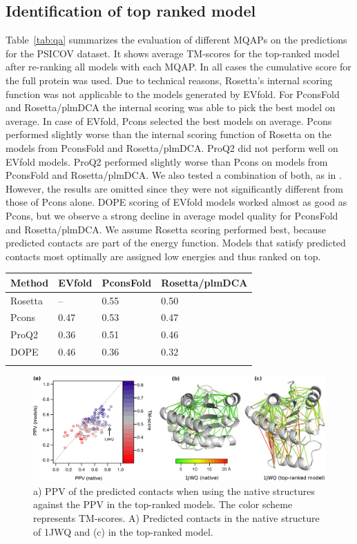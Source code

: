 \documentclass{bioinfo}
\begin{document}
\subsection{Identification of top ranked model}
Table~\ref{tab:qa} summarizes the evaluation of different MQAPs on the
predictions for the PSICOV dataset. It shows average TM-scores for the
top-ranked model after re-ranking all models with each MQAP. In all
cases the cumulative score for the full protein was used. Due to
technical reasons, Rosetta's internal scoring function was not
applicable to the models generated by EVfold. For PconsFold and
Rosetta/plmDCA the internal scoring was able to pick the best model on
average. In case of EVfold, Pcons selected the best models on
average. Pcons performed slightly worse than the internal scoring
function of Rosetta on the models from PconsFold and
Rosetta/plmDCA. ProQ2 did not perform well on EVfold models. ProQ2 performed slightly worse than
Pcons on models from PconsFold and Rosetta/plmDCA. We also tested a
combination of both, as in \citeauthor{wallner_pcons.net:_2007}
\citeyear{wallner_pcons.net:_2007}. However, the results are omitted
since they were not significantly different from those of Pcons
alone. DOPE scoring of EVfold models worked almost as good as Pcons,
but we observe a strong decline in average model quality for PconsFold
and Rosetta/plmDCA. We assume Rosetta scoring performed best, because predicted contacts
are part of the energy function. Models that satisfy predicted
contacts most optimally are assigned low energies and thus ranked on top.

\begin{table}[!t]
{\begin{tabular}{llll}\toprule
Method & EVfold & PconsFold & Rosetta/plmDCA \\ \midrule
Rosetta & -- & 0.55 & 0.50 \\
Pcons & 0.47 & 0.53 & 0.47 \\
ProQ2 & 0.36 & 0.51 & 0.46 \\
DOPE & 0.46 & 0.36 & 0.32 \\ \botrule
\end{tabular}}{}
\end{table}

\begin{figure}[!tpb]%
\centerline{\includegraphics[scale=0.7]{figures/qa.eps}}
\caption{a) PPV of the predicted contacts when using the native
  structures against the PPV in the top-ranked models. The color
  scheme represents TM-scores. A) Predicted contacts in the native structure of 1JWQ and (c) in the top-ranked model.}\label{fig:qa}
\end{figure}
\end{document}
